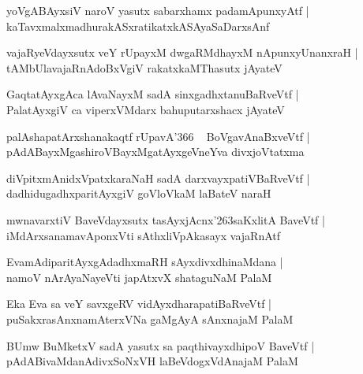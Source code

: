 \documentclass[twoside,12pt,openright]{book}
\def\S{\char'263}
\newcounter{shloka}[chapter]
\begin{document}
\begin{shloka}%
yoVgABAyxsiV naroV yasutx sabarxhamx padamApunxyAtf |\\
kaTavxmalxmadhurakASxratikatxkASAyaSaDarxsAnf
\end{shloka}

\begin{shloka}%
vajaRyeVdayxsutx veY rUpayxM dwgaRMdhayxM nApunxyUnanxraH |\\
tAMbUlavajaRnAdoBxVgiV rakatxkaMThasutx jAyateV
\end{shloka}

\begin{shloka}%
GaqtatAyxgAca lAvaNayxM sadA sinxgadhxtanuBaRveVtf |\\
PalatAyxgiV ca viperxVMdarx bahuputarxshacx jAyateV
\end{shloka}

\begin{shloka}%
palAshapatArxshanakaqtf rUpavA\char'366 ~ BoVgavAnaBxveVtf |\\
pAdABayxMgashiroVBayxMgatAyxgeVneYva divxjoVtatxma
\end{shloka}

\begin{shloka}%
diVpitxmAnidxVpatxkaraNaH sadA darxvayxpatiVBaRveVtf |\\
dadhidugadhxparitAyxgiV goVloVkaM laBateV naraH 
\end{shloka}

\begin{shloka}%
mwnavarxtiV BaveVdayxsutx tasAyxjAcnx\S saKxlitA BaveVtf |\\
iMdArxsanamavAponxVti sAthxliVpAkasayx vajaRnAtf
\end{shloka}

\begin{shloka}%
EvamAdiparitAyxgAdadhxmaRH sAyxdivxdhinaMdana |\\
namoV nArAyaNayeVti japAtxvX shataguNaM PalaM 
\end{shloka}

\begin{shloka}%
Eka Eva sa veY savxgeRV vidAyxdharapatiBaRveVtf |\\
puSakxrasAnxnamAterxVNa gaMgAyA sAnxnajaM PalaM 
\end{shloka}

\begin{shloka}%
BUmw BuMketxV sadA yasutx sa paqthivayxdhipoV BaveVtf |\\
pAdABivaMdanAdivxSoNxVH laBeVdogxVdAnajaM PalaM 
\end{shloka}
\end{document}
